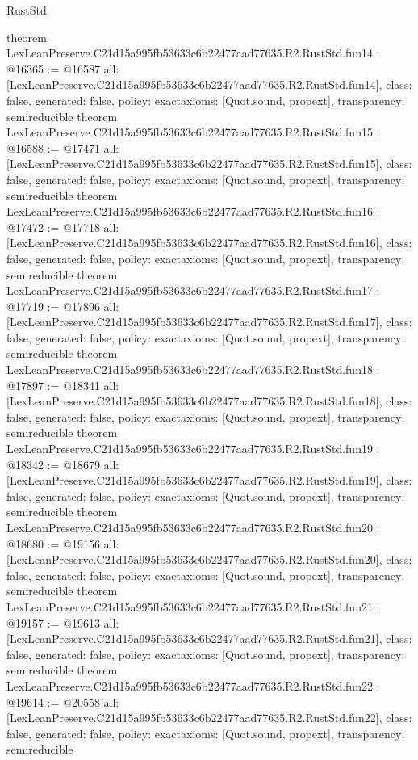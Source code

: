 \begin{lexlean}{RustStd}
\begin{coremodule}
{}
theorem LexLeanPreserve.C21d15a995fb53633c6b22477aad77635.R2.RustStd.fun14 : @16365 := @16587 {
  all: [LexLeanPreserve.C21d15a995fb53633c6b22477aad77635.R2.RustStd.fun14],
  class: false,
  generated: false,
  policy: exact{axioms: [Quot.sound, propext]},
  transparency: semireducible
}
theorem LexLeanPreserve.C21d15a995fb53633c6b22477aad77635.R2.RustStd.fun15 : @16588 := @17471 {
  all: [LexLeanPreserve.C21d15a995fb53633c6b22477aad77635.R2.RustStd.fun15],
  class: false,
  generated: false,
  policy: exact{axioms: [Quot.sound, propext]},
  transparency: semireducible
}
theorem LexLeanPreserve.C21d15a995fb53633c6b22477aad77635.R2.RustStd.fun16 : @17472 := @17718 {
  all: [LexLeanPreserve.C21d15a995fb53633c6b22477aad77635.R2.RustStd.fun16],
  class: false,
  generated: false,
  policy: exact{axioms: [Quot.sound, propext]},
  transparency: semireducible
}
theorem LexLeanPreserve.C21d15a995fb53633c6b22477aad77635.R2.RustStd.fun17 : @17719 := @17896 {
  all: [LexLeanPreserve.C21d15a995fb53633c6b22477aad77635.R2.RustStd.fun17],
  class: false,
  generated: false,
  policy: exact{axioms: [Quot.sound, propext]},
  transparency: semireducible
}
theorem LexLeanPreserve.C21d15a995fb53633c6b22477aad77635.R2.RustStd.fun18 : @17897 := @18341 {
  all: [LexLeanPreserve.C21d15a995fb53633c6b22477aad77635.R2.RustStd.fun18],
  class: false,
  generated: false,
  policy: exact{axioms: [Quot.sound, propext]},
  transparency: semireducible
}
theorem LexLeanPreserve.C21d15a995fb53633c6b22477aad77635.R2.RustStd.fun19 : @18342 := @18679 {
  all: [LexLeanPreserve.C21d15a995fb53633c6b22477aad77635.R2.RustStd.fun19],
  class: false,
  generated: false,
  policy: exact{axioms: [Quot.sound, propext]},
  transparency: semireducible
}
theorem LexLeanPreserve.C21d15a995fb53633c6b22477aad77635.R2.RustStd.fun20 : @18680 := @19156 {
  all: [LexLeanPreserve.C21d15a995fb53633c6b22477aad77635.R2.RustStd.fun20],
  class: false,
  generated: false,
  policy: exact{axioms: [Quot.sound, propext]},
  transparency: semireducible
}
theorem LexLeanPreserve.C21d15a995fb53633c6b22477aad77635.R2.RustStd.fun21 : @19157 := @19613 {
  all: [LexLeanPreserve.C21d15a995fb53633c6b22477aad77635.R2.RustStd.fun21],
  class: false,
  generated: false,
  policy: exact{axioms: [Quot.sound, propext]},
  transparency: semireducible
}
theorem LexLeanPreserve.C21d15a995fb53633c6b22477aad77635.R2.RustStd.fun22 : @19614 := @20558 {
  all: [LexLeanPreserve.C21d15a995fb53633c6b22477aad77635.R2.RustStd.fun22],
  class: false,
  generated: false,
  policy: exact{axioms: [Quot.sound, propext]},
  transparency: semireducible
}
\end{coremodule}
\end{lexlean}
